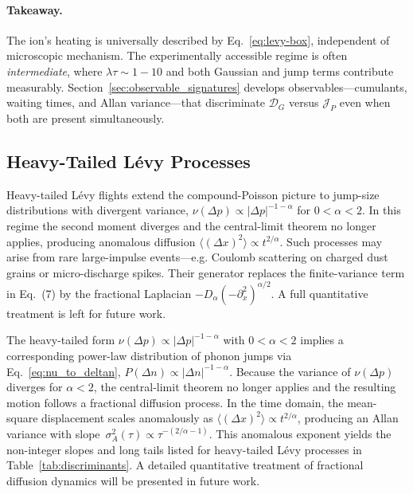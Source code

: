 \paragraph{Takeaway.}
The ion's heating is universally described by Eq.~\eqref{eq:levy-box}, independent of microscopic mechanism.
The experimentally accessible regime is often \emph{intermediate}, where $\lambda \tau \sim 1{-}10$ and both Gaussian and jump terms contribute measurably.
Section~\ref{sec:observable_signatures} develops observables—cumulants, waiting times, and Allan variance—that discriminate $\mathcal{D}_G$ versus $\mathcal{J}_P$ even when both are present simultaneously.

\subsection{Heavy-Tailed Lévy Processes}
Heavy-tailed Lévy flights extend the compound-Poisson picture to jump-size distributions with divergent variance,
$\nu(\Delta p)\!\propto\! |\Delta p|^{-1-\alpha}$ for $0<\alpha<2$.
In this regime the second moment diverges and the central-limit theorem no longer applies, producing anomalous diffusion $\langle (\Delta x)^2 \rangle \propto t^{2/\alpha}$.
Such processes may arise from rare large-impulse events—e.g. Coulomb scattering on charged dust grains or micro-discharge spikes.
Their generator replaces the finite-variance term in Eq.~(7) by the fractional Laplacian $-D_\alpha(-\partial_x^2)^{\alpha/2}$.
A full quantitative treatment is left for future work.

The heavy-tailed form $\nu(\Delta p)\!\propto\!|\Delta p|^{-1-\alpha}$ with
$0<\alpha<2$ implies a corresponding power-law distribution of phonon jumps
via Eq.~\eqref{eq:nu_to_deltan},
$P(\Delta n)\!\propto\!|\Delta n|^{-1-\alpha}$.
Because the variance of $\nu(\Delta p)$ diverges for $\alpha<2$, the
central-limit theorem no longer applies and the resulting motion follows a
fractional diffusion process.
In the time domain, the mean-square displacement scales anomalously as
$\langle(\Delta x)^2\rangle\!\propto\!t^{2/\alpha}$, producing an Allan
variance with slope $\,\sigma^2_A(\tau)\!\propto\!\tau^{-(2/\alpha-1)}$.
This anomalous exponent yields the non-integer slopes and long tails listed
for heavy-tailed Lévy processes in Table~\ref{tab:discriminants}.
A detailed quantitative treatment of fractional diffusion dynamics will be
presented in future work.
